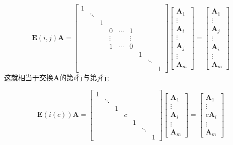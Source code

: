 \documentclass[compress,mathserif,cjk]{beamer}
\theoremstyle{remark}
\numberwithin{equation}{section}
\begin{document}
\begin{CJK}{UTF8}{gbsn}
\begin{frame}
$$\bm E(i,j)\bm A=\left[\begin{matrix}1&&&&&&&&\\ &\ddots&&&&&&&\\&&1&&&&&&\\&&&0&\cdots&1&&&\\&&&\vdots&&\vdots&&&\\ &&&1&\cdots&0&&&\\&&&&&&1&&\\&&&&&&&\ddots&\\&&&&&&&&1\end{matrix}\right]\left[\begin{matrix}\bm A_1\\\vdots\\\bm A_i\\\vdots\\\bm A_j\\\vdots\\\bm A_m\end{matrix}\right]
=\left[\begin{matrix}\bm A_1\\\vdots\\\bm A_j\\\vdots\\\bm A_i\\\vdots\\\bm A_m\end{matrix}\right]$$
这就相当于交换$\bm A$的第$i$行与第$j$行;
\end{frame}
\begin{frame}
$$\bm E(i(c))\bm A=\left[\begin{matrix}1&&&&&&\\&\ddots&&&&&\\&&1&&&&\\&&&c&&&\\&&&&1&&\\&&&&&\ddots&\\&&&&&&1\end{matrix}\right]
\left[\begin{matrix}\bm A_1\\\vdots\\\bm A_i\\\vdots\\\bm A_m\end{matrix}\right]
=\left[\begin{matrix}\bm A_1\\\vdots\\c\bm A_i\\\vdots\\\bm A_m\end{matrix}\right]$$

\end{frame}
\end{CJK}
\end{document}
